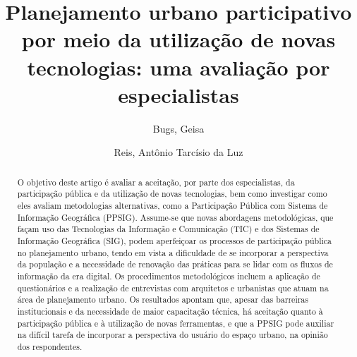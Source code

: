 \documentclass{article}
\begin{document}
\title{Planejamento urbano participativo por meio da utilização de novas
tecnologias: uma avaliação por especialistas}
\author[1]{Bugs, Geisa}
\author[2]{Reis, Antônio Tarcísio da Luz}

\maketitle


\begin{abstract}
O objetivo deste artigo é avaliar a aceitação, por parte dos especialistas, da
participação pública e da utilização de novas tecnologias, bem como investigar
como eles avaliam metodologias alternativas, como a Participação Pública com
Sistema de Informação Geográfica (PPSIG). Assume-se que novas abordagens
metodológicas, que façam uso das Tecnologias da Informação e Comunicação (TIC) e
dos Sistemas de Informação Geográfica (SIG), podem aperfeiçoar os processos de
participação pública no planejamento urbano, tendo em vista a dificuldade de se
incorporar a perspectiva da população e a necessidade de renovação das práticas
para se lidar com os fluxos de informação da era digital. Os procedimentos
metodológicos incluem a aplicação de questionários e a realização de entrevistas
com arquitetos e urbanistas que atuam na área de planejamento urbano. Os
resultados apontam que, apesar das barreiras institucionais e da necessidade de
maior capacitação técnica, há aceitação quanto à participação pública e à
utilização de novas ferramentas, e que a PPSIG pode auxiliar na difícil tarefa
de incorporar a perspectiva do usuário do espaço urbano, na opinião dos
respondentes.
\end{abstract}
\end{document}

